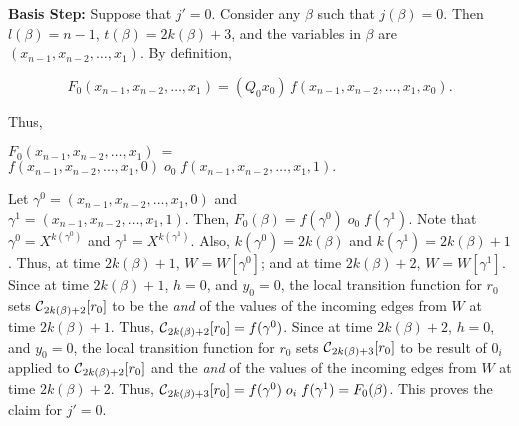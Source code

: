 \smallskip
\noindent
{\bf Basis Step:} Suppose that $j' = 0$.
Consider any $\beta$ such that $j(\beta) = 0$.
Then $l(\beta) = n-1$, $t(\beta) = 2k(\beta) + 3$,
and the variables in $\beta$ are $(x_{n-1}, x_{n-2}, \ldots , x_1)$.
By definition,

\smallskip

$$F_0(x_{n-1}, x_{n-2}, \ldots, x_1) 
= (Q_0 x_0) \, f(x_{n-1}, x_{n-2}, \ldots , x_1, x_0).$$

\smallskip

\noindent
Thus,\\ \smallskip

$F_0(x_{n-1}, x_{n-2}, \ldots , x_1) ~=~$ \\
\hspace*{0.1in}
$f(x_{n-1}, x_{n-2}, \ldots , x_1, 0) \; o_0 \; 
f(x_{n-1}, x_{n-2}, \ldots , x_1, 1).$ \\

\smallskip

\noindent
Let $\gamma^0 = (x_{n-1}, x_{n-2}, \ldots , x_1, 0)$ and\\
$\gamma^1 = (x_{n-1}, x_{n-2}, \ldots , x_1, 1)$.
Then, $F_0(\beta) =  
f(\gamma^0) \; o_0 \; f(\gamma^1)$.
Note that $\gamma^0 = X^{k(\gamma^0)}$ and $\gamma^1 = X^{k(\gamma^1)}$.
Also, $k(\gamma^0) = 2k(\beta)$ and $k(\gamma^1) = 2k(\beta)+1$.
Thus, at time $2k(\beta)+1$, $W = W[\gamma^0]$;
and at time $2k(\beta)+2$, $W = W[\gamma^1]$.
Since at time $2k(\beta)+1$, $h=0$, and $y_0 = 0$, 
the local transition function for $r_0$ sets $\mbox{$\mathcal{C}$}_{2k(\beta)+2}[r_0]$ to be 
the {\em and} of the values of the incoming edges from $W$ at time $2k(\beta)+1$.
Thus, $\mbox{$\mathcal{C}$}_{2k(\beta)+2}[r_0] = f(\gamma^0)$.
Since at time $2k(\beta)+2$, $h=0$, and $y_0 = 0$, 
the local transition function for $r_0$ sets $\mbox{$\mathcal{C}$}_{2k(\beta)+3}[r_0]$ to be result of $0_i$
applied to $\mbox{$\mathcal{C}$}_{2k(\beta)+2}[r_0]$ and
the {\em and} of the values of the incoming edges from $W$ at time $2k(\beta)+2$.
Thus, $\mbox{$\mathcal{C}$}_{2k(\beta)+3}[r_0] = f(\gamma^0) \; o_i \; f(\gamma^1) = F_0(\beta)$.
This proves the claim for $j' = 0$.

